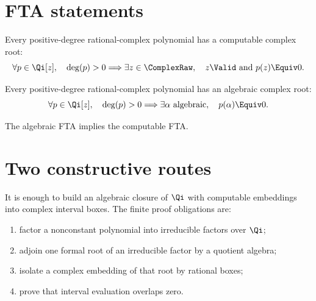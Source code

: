\section{FTA statements}

\begin{conjecture}\label{conj:computable-fta}
Every positive-degree rational-complex polynomial has a computable complex
root:
\[
  \forall p\in\Qi[z],\quad \deg(p)>0
  \Longrightarrow
  \exists z\in\ComplexRaw,\quad z\Valid\ \text{and}\ p(z)\Equiv 0.
\]
\end{conjecture}

\begin{conjecture}\label{conj:algebraic-fta}
Every positive-degree rational-complex polynomial has an algebraic complex
root:
\[
  \forall p\in\Qi[z],\quad \deg(p)>0
  \Longrightarrow
  \exists \alpha\ \text{algebraic},\quad p(\alpha)\Equiv 0.
\]
\end{conjecture}

\begin{theorem}
\label{thm:computable-fta-of-algebraic-fta}
\leanok
The algebraic FTA implies the computable FTA.
\end{theorem}

\section{Two constructive routes}

\begin{proposition}\label{prop:fta-algebraic-route}
It is enough to build an algebraic closure of \(\Qi\) with computable
embeddings into complex interval boxes.  The finite proof obligations are:
\begin{enumerate}
  \item factor a nonconstant polynomial into irreducible factors over \(\Qi\);
  \item adjoin one formal root of an irreducible factor by a quotient algebra;
  \item isolate a complex embedding of that root by rational boxes;
  \item prove that interval evaluation overlaps zero.
\end{enumerate}
\end{proposition}

